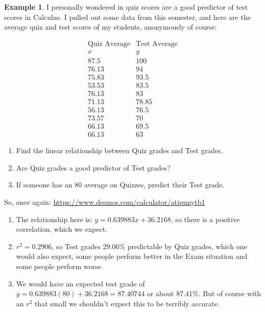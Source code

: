 \documentclass[10pt]{article}
\theoremstyle{definition}
\newtheorem{example}[equation]{Example}
\begin{document}
\begin{example}
I personally wondered in quiz scores are a good predictor of test scores in Calculus.  I pulled out some data from this semester, and here are the average quiz and test scores of my students, anonymously of course:


$$\begin{array}{c|c}
\text{Quiz Average} & \text{Test Average}\\
x&y\\
\hline
87.5&100\\
76.13&94\\
75.83&93.5\\
53.53&83.5\\
76.13&83\\
71.13&78.85\\
56.13&76.5\\
73.57&70\\
66.13&69.5\\
66.13&63
\end{array}$$



\end{example}
\begin{enumerate}
\item Find the linear relationship between Quiz grades and Test grades.
\item Are Quiz grades a good predictor of Test grades?
\item If someone has an 80 average on Quizzes, predict their Test grade.
\end{enumerate}

So, once again:  \url{https://www.desmos.com/calculator/atipunytb1}

\begin{enumerate}
\item The relationship here is: $y=0.639883x+36.2168$, so there is a positive correlation, which we expect.
\item $r^2=0.2906$, so Test grades 29.06\% predictable by Quiz grades, which one would also expect, some people perform better in the Exam situation and some people perform worse.
\item We would have an expected test grade of $y=0.639883(80)+36.2168=87.40744$ or about 87.41\%.  But of course with an $r^2$ that small we shouldn't expect this to be terribly accurate.
\end{enumerate}
\end{document}
